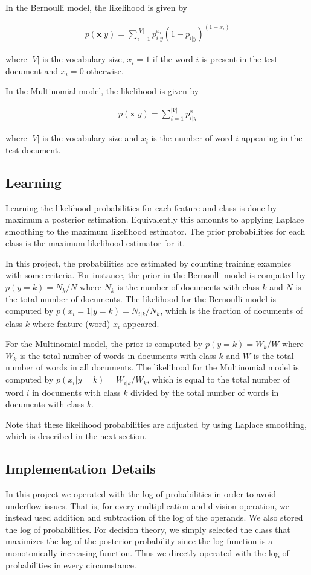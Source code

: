 \documentclass[12pt]{article}
\begin{document}
In the Bernoulli model, the likelihood is given by 

\begin{align}
p(\textbf{x}|y) = \sum_{i=1}^{|V|} p_{i|y}^{x_i} (1 - p_{i|y})^{(1-x_i)}
\end{align}

where \(|V|\) is the vocabulary size, \(x_i = 1\) if the word \(i\) is present in the test document and \(x_i = 0\) otherwise.

In the Multinomial model, the likelihood is given by 

\begin{align}
p(\textbf{x}|y) = \sum_{i=1}^{|V|} p_{i|y}^{x}
\end{align}

where \(|V|\) is the vocabulary size and \(x_i\) is the number of word \(i\) appearing in the test document.

\subsection{Learning}
Learning the likelihood probabilities for each feature and class is done by maximum a posterior estimation. Equivalently this amounts to applying Laplace smoothing to the maximum likelihood estimator. The prior probabilities for each class is the maximum likelihood estimator for it.

In this project, the probabilities are estimated by counting training examples with some criteria. For instance, the prior in the Bernoulli model is computed by \(p(y = k) = N_k/N\) where \(N_k\) is the number of documents with class \(k\) and \(N\) is the total number of documents. The likelihood for the Bernoulli model is computed by \(p(x_i = 1 | y = k) = N_{i|k}/N_k\), which is the fraction of documents of class \(k\) where feature (word) \(x_i\) appeared.

For the Multinomial model, the prior is computed by \(p(y = k) = W_k/W\) where \(W_k\) is the total number of words in documents with class \(k\) and \(W\) is the total number of words in all documents. The likelihood for the Multinomial model is computed by \(p(x_i | y = k) = W_{i|k}/W_k\), which is equal to the total number of word \(i\) in documents with class \(k\) divided by the total number of words in documents with class \(k\).

Note that these likelihood probabilities are adjusted by using Laplace smoothing, which is described in the next section.

\subsection{Implementation Details}
In this project we operated with the log of probabilities in order to avoid underflow issues. That is, for every multiplication and division operation, we instead used addition and subtraction of the log of the operands. We also stored the log of probabilities. For decision theory, we simply selected the class that maximizes the log of the posterior probability since the log function is a monotonically increasing function. Thus we directly operated with the log of probabilities in every circumstance.
\end{document}
